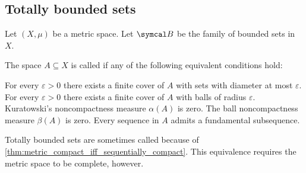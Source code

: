 \subsection{Totally bounded sets}\label{subsec:totally_bounded_sets}

Let \( (X, \mu) \) be a metric space. Let \( \Cal{B} \) be the family of bounded sets in \( X \).

\begin{definition}\label{def:totally_bounded_set}
  The space \( A \subseteq X \) is called  if any of the following equivalent conditions hold:

  \begin{defenum}
     For every \( \varepsilon > 0 \) there exists a finite cover of \( A \) with sets with diameter at most \( \varepsilon \).
     For every \( \varepsilon > 0 \) there exists a finite cover of \( A \) with balls of radius \( \varepsilon \).
     Kuratowski's noncompactness measure \( \alpha(A) \) is zero.
     The ball noncompactness measure \( \beta(A) \) is zero.
     Every sequence in \( A \) admits a fundamental subsequence.
  \end{defenum}

  Totally bounded sets are sometimes called  because of \cref{thm:metric_compact_iff_sequentially_compact}. This equivalence requires the metric space to be complete, however.
\end{definition}
